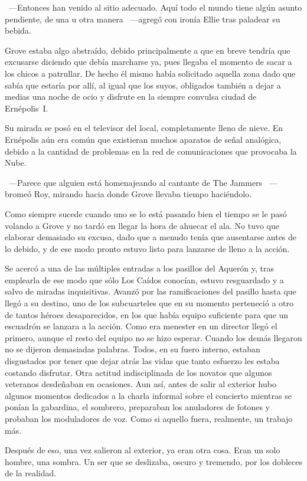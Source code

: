 ~---Entonces han venido al sitio adecuado. Aquí todo el mundo tiene algún asunto pendiente, de una u otra manera ~---agregó con ironía Ellie tras paladear su bebida.

Grove estaba algo abstraído, debido principalmente a que en breve tendría que excusarse diciendo que debía marcharse ya, pues llegaba el momento de sacar a los chicos a patrullar. De hecho él mismo había solicitado aquella zona dado que sabía que estaría por allí, al igual que los suyos, obligados también a dejar a medias una noche de ocio y disfrute en la siempre convulsa ciudad de Ernépolis~I.

Su mirada se posó en el televisor del local, completamente lleno de nieve. En Ernépolis aún era común que existieran muchos aparatos de señal analógica, debido a la cantidad de problemas en la red de comunicaciones que provocaba la Nube.

~---Parece que alguien está homenajeando al cantante de The Jammers ~---bromeó Roy, mirando hacia donde Grove llevaba tiempo haciéndolo.

Como siempre sucede cuando uno se lo está pasando bien el tiempo se le pasó volando a Grove y no tardó en llegar la hora de ahuecar el ala. No tuvo que elaborar demasiado su excusa, dado que a menudo tenía que ausentarse antes de lo debido, y de ese modo pronto estuvo listo para lanzarse de lleno a la acción.

Se acercó a una de las múltiples entradas a los pasillos del Aquerón y, tras emplearla de ese modo que sólo Los Caídos conocían, estuvo resguardado y a salvo de miradas inquisitivas. Avanzó por las ramificaciones del pasillo hasta que llegó a su destino, uno de los subcuarteles que en su momento perteneció a otro de tantos héroes desaparecidos, en los que había equipo suficiente para que un escuadrón se lanzara a la acción. Como era menester en un director llegó el primero, aunque el resto del equipo no se hizo esperar. Cuando los demás llegaron no se dijeron demasiadas palabras. Todos, en su fuero interno, estaban disgustados por tener que dejar atrás las vidas que tanto esfuerzo les estaba costando disfrutar. Otra actitud indisciplinada de los novatos que algunos veteranos desdeñaban en ocasiones. Aun así, antes de salir al exterior hubo algunos momentos dedicados a la charla informal sobre el concierto mientras se ponían la gabardina, el sombrero, preparaban los anuladores de fotones y probaban los moduladores de voz. Como si aquello fuera, realmente, un trabajo más.

Después de eso, una vez salieron al exterior, ya eran otra cosa. Eran un solo hombre, una sombra. Un ser que se deslizaba, oscuro y tremendo, por los dobleces de la realidad.

